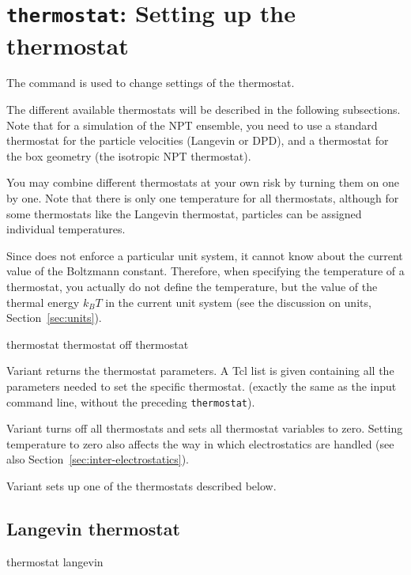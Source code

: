 \section{\texttt{thermostat}: Setting up the thermostat}
\label{sec:thermostat}

The  command is used to change settings of the
thermostat.  

The different available thermostats will be described in the following
subsections. Note that for a simulation of the NPT ensemble, you need
to use a standard thermostat for the particle velocities (\eg Langevin
or DPD), and a thermostat for the box geometry (\eg the isotropic NPT
thermostat).

You may combine different thermostats at your own risk by turning them
on one by one. Note that there is only one temperature for all
thermostats, although for some thermostats like the Langevin thermostat,
particles can be assigned individual temperatures.

Since \es{} does not enforce a particular unit system, it cannot know
about the current value of the Boltzmann constant. Therefore, when
specifying the temperature of a thermostat, you actually do not define
the temperature, but the value of the thermal energy $k_B T$ in the
current unit system (see the discussion on units, Section~\ref{sec:units}).

\begin{essyntax}
   thermostat
   thermostat off
   thermostat 
\end{essyntax}

Variant  returns the thermostat parameters. A Tcl list is
given containing all the parameters needed to set the specific
thermostat. (exactly the same as the input command line, without the
preceding \texttt{thermostat}).

Variant  turns off all thermostats and sets all thermostat 
variables to zero. Setting temperature to zero also affects the way in which 
electrostatics are handled (see also Section~\ref{sec:inter-electrostatics}).

Variant  sets up one of the thermostats described below.

\subsection{Langevin thermostat}
\begin{essyntax}
  thermostat langevin  
\end{essyntax}


